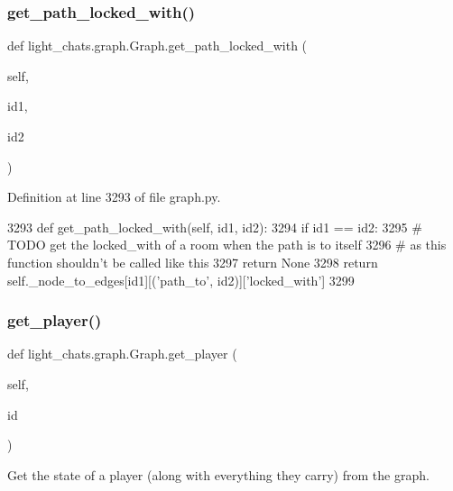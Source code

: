 \subsubsection{\texorpdfstring{get\+\_\+path\+\_\+locked\+\_\+with()}{get\_path\_locked\_with()}}
{\footnotesize\ttfamily def light\+\_\+chats.\+graph.\+Graph.\+get\+\_\+path\+\_\+locked\+\_\+with (\begin{DoxyParamCaption}\item[{}]{self,  }\item[{}]{id1,  }\item[{}]{id2 }\end{DoxyParamCaption})}



Definition at line 3293 of file graph.\+py.


\begin{DoxyCode}
3293     \textcolor{keyword}{def }get\_path\_locked\_with(self, id1, id2):
3294         \textcolor{keywordflow}{if} id1 == id2:
3295             \textcolor{comment}{# TODO get the locked\_with of a room when the path is to itself}
3296             \textcolor{comment}{# as this function shouldn't be called like this}
3297             \textcolor{keywordflow}{return} \textcolor{keywordtype}{None}
3298         \textcolor{keywordflow}{return} self.\_node\_to\_edges[id1][(\textcolor{stringliteral}{'path\_to'}, id2)][\textcolor{stringliteral}{'locked\_with'}]
3299 
\end{DoxyCode}
\mbox{\label{classlight__chats_1_1graph_1_1Graph_a7f86299224bed2c821ed4ffa853cd669}} 
\subsubsection{\texorpdfstring{get\+\_\+player()}{get\_player()}}
{\footnotesize\ttfamily def light\+\_\+chats.\+graph.\+Graph.\+get\+\_\+player (\begin{DoxyParamCaption}\item[{}]{self,  }\item[{}]{id }\end{DoxyParamCaption})}

\begin{DoxyVerb}Get the state of a player (along with everything they carry) from the graph.
\end{DoxyVerb}
 

